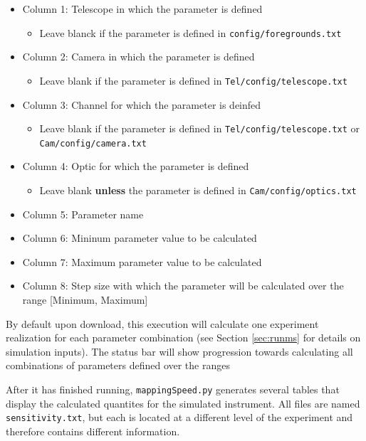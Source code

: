 \documentclass[11pt]{article} %
\begin{document}
\begin{itemize}[noitemsep,topsep=0pt]
	\item Column 1: Telescope in which the parameter is defined
		\begin{itemize}[noitemsep,topsep=0pt]
		\item Leave blanck if the parameter is defined in \texttt{config/foregrounds.txt}
		\end{itemize}
	\item Column 2: Camera in which the parameter is defined 
		\begin{itemize}[noitemsep,topsep=0pt]
		\item Leave blank if the parameter is defined in \texttt{Tel/config/telescope.txt}
		\end{itemize}
	\item Column 3: Channel for which the parameter is deinfed 
		\begin{itemize}[noitemsep,topsep=0pt]
		\item Leave blank if the parameter is defined in \texttt{Tel/config/telescope.txt} or \texttt{Cam/config/camera.txt}
		\end{itemize}
	\item Column 4: Optic for which the parameter is defined
		\begin{itemize}[noitemsep,topsep=0pt]
		\item Leave blank \textbf{unless} the parameter is defined in \texttt{Cam/config/optics.txt}
		\end{itemize}
	\item Column 5: Parameter name
	\item Column 6: Mininum parameter value to be calculated
	\item Column 7: Maximum parameter value to be calculated
	\item Column 8: Step size with which the parameter will be calculated over the range [Minimum, Maximum]
\end{itemize}

By default upon download, this execution will calculate one experiment realization for each parameter combination (see Section \ref{sec:runms} for details on simulation inputs). The status bar will show progression towards calculating all combinations of parameters defined over the ranges 

After it has finished running, \texttt{mappingSpeed.py} generates several tables that display the calculated quantites for the simulated instrument. All files are named \texttt{sensitivity.txt}, but each is located at a different level of the experiment and therefore contains different information.
\end{document}
